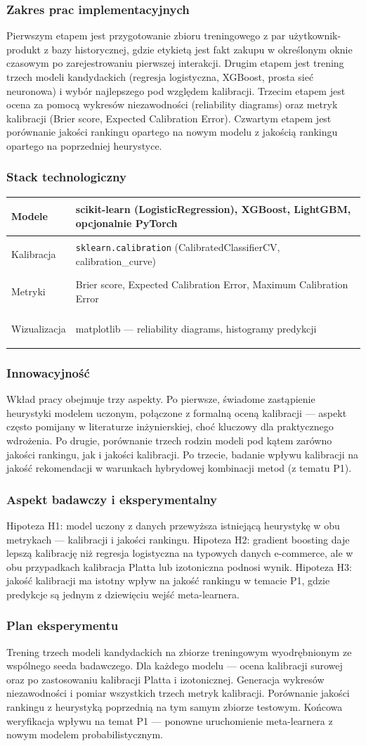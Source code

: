 \documentclass[12pt,a4paper]{article}
\newenvironment{stacktab}{%
    \arrayrulecolor{border}%
    \begin{tabular}{|>{\columncolor{lightbg}\bfseries\color{primary}\raggedright\arraybackslash}p{4.2cm}|>{\raggedright\arraybackslash}p{12cm}|}
    \hline
}{%
    \end{tabular}%
    \arrayrulecolor{black}%
}
\newcommand{\stackrow}[2]{#1 & #2 \\ \hline}
\newcommand{\topicsection}[1]{\subsubsection*{#1}}
\begin{document}
\topicsection{Zakres prac implementacyjnych}
Pierwszym etapem jest przygotowanie zbioru treningowego z par użytkownik-produkt z bazy historycznej, gdzie etykietą jest fakt zakupu w określonym oknie czasowym po zarejestrowaniu pierwszej interakcji. Drugim etapem jest trening trzech modeli kandydackich (regresja logistyczna, XGBoost, prosta sieć neuronowa) i wybór najlepszego pod względem kalibracji. Trzecim etapem jest ocena za pomocą wykresów niezawodności (reliability diagrams) oraz metryk kalibracji (Brier score, Expected Calibration Error). Czwartym etapem jest porównanie jakości rankingu opartego na nowym modelu z jakością rankingu opartego na poprzedniej heurystyce.

\topicsection{Stack technologiczny}
\begin{stacktab}
\stackrow{Modele}{scikit-learn (LogisticRegression), XGBoost, LightGBM, opcjonalnie PyTorch}
\stackrow{Kalibracja}{\texttt{sklearn.calibration} (CalibratedClassifierCV, calibration\_curve)}
\stackrow{Metryki}{Brier score, Expected Calibration Error, Maximum Calibration Error}
\stackrow{Wizualizacja}{matplotlib --- reliability diagrams, histogramy predykcji}
\end{stacktab}

\topicsection{Innowacyjność}
Wkład pracy obejmuje trzy aspekty. Po pierwsze, świadome zastąpienie heurystyki modelem uczonym, połączone z formalną oceną kalibracji --- aspekt często pomijany w literaturze inżynierskiej, choć kluczowy dla praktycznego wdrożenia. Po drugie, porównanie trzech rodzin modeli pod kątem zarówno jakości rankingu, jak i jakości kalibracji. Po trzecie, badanie wpływu kalibracji na jakość rekomendacji w warunkach hybrydowej kombinacji metod (z tematu P1).

\topicsection{Aspekt badawczy i eksperymentalny}
Hipoteza H1: model uczony z danych przewyższa istniejącą heurystykę w obu metrykach --- kalibracji i jakości rankingu. Hipoteza H2: gradient boosting daje lepszą kalibrację niż regresja logistyczna na typowych danych e-commerce, ale w obu przypadkach kalibracja Platta lub izotoniczna podnosi wynik. Hipoteza H3: jakość kalibracji ma istotny wpływ na jakość rankingu w temacie P1, gdzie predykcje są jednym z dziewięciu wejść meta-learnera.

\topicsection{Plan eksperymentu}
Trening trzech modeli kandydackich na zbiorze treningowym wyodrębnionym ze wspólnego seeda badawczego. Dla każdego modelu --- ocena kalibracji surowej oraz po zastosowaniu kalibracji Platta i izotonicznej. Generacja wykresów niezawodności i pomiar wszystkich trzech metryk kalibracji. Porównanie jakości rankingu z heurystyką poprzednią na tym samym zbiorze testowym. Końcowa weryfikacja wpływu na temat P1 --- ponowne uruchomienie meta-learnera z nowym modelem probabilistycznym.
\end{document}
